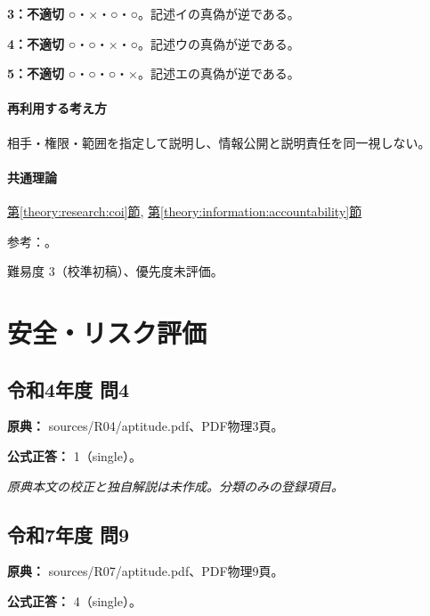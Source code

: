 \noindent\textbf{3：不適切} ○・×・○・○。記述イの真偽が逆である。\par

\noindent\textbf{4：不適切} ○・○・×・○。記述ウの真偽が逆である。\par

\noindent\textbf{5：不適切} ○・○・○・×。記述エの真偽が逆である。\par

\paragraph{再利用する考え方} 相手・権限・範囲を指定して説明し、情報公開と説明責任を同一視しない。

\paragraph{共通理論} \hyperref[theory:research:coi]{第\ref*{theory:research:coi}節}, \hyperref[theory:information:accountability]{第\ref*{theory:information:accountability}節}

\par 参考：\cite{singapore2010,scj_code2013}。

\par 難易度 3（校準初稿）、優先度未評価。

\section{安全・リスク評価}

\subsection{令和4年度 問4}
\label{q:r04-reg-apt-04}

\noindent\textbf{原典：} sources/R04/aptitude.pdf、PDF物理3頁。

\textbf{公式正答：} 1（single）。

\par\textit{原典本文の校正と独自解説は未作成。分類のみの登録項目。}

\subsection{令和7年度 問9}
\label{q:r07-reg-apt-09}

\noindent\textbf{原典：} sources/R07/aptitude.pdf、PDF物理9頁。

\textbf{公式正答：} 4（single）。

